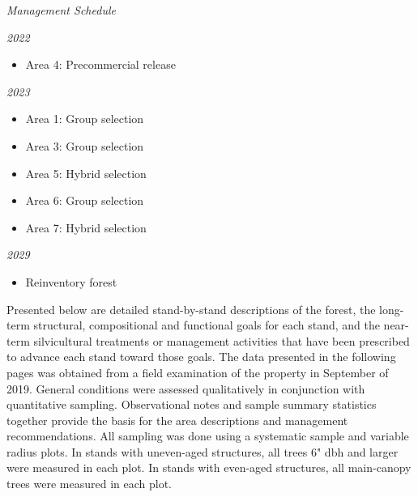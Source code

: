\documentclass[]{tufte-handout}
\begin{document}
\begin{marginfigure} \noindent \textit{\LARGE Management Schedule} 

 \vspace{10 pt} 

 \noindent \textit{\large 2022} 

 \begin{itemize} \item Area 4: Precommercial release 

 \end{itemize} \vspace{10 pt} 

 \noindent \textit{\large 2023} 

 \begin{itemize} \item Area 1: Group selection 

 \item Area 3: Group selection 

 \item Area 5: Hybrid selection 

 \item Area 6: Group selection 

 \item Area 7: Hybrid selection 

 \end{itemize} \vspace{10 pt} 

 \noindent \textit{\large 2029} 

 \begin{itemize} \item Reinventory forest 

 \end{itemize} \end{marginfigure}

Presented below are detailed stand-by-stand descriptions of the forest,
the long-term structural, compositional and functional goals for each
stand, and the near-term silvicultural treatments or management
activities that have been prescribed to advance each stand toward those
goals. The data presented in the following pages was obtained from a
field examination of the property in September of 2019. General
conditions were assessed qualitatively in conjunction with quantitative
sampling. Observational notes and sample summary statistics together
provide the basis for the area descriptions and management
recommendations. All sampling was done using a systematic sample and
variable radius plots. In stands with uneven-aged structures, all trees
6" dbh and larger were measured in each plot. In stands with even-aged
structures, all main-canopy trees were measured in each plot.
\end{document}
